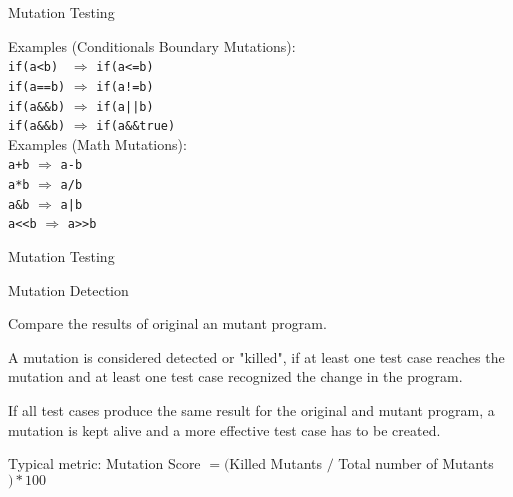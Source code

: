 \begin{frame}{Mutation Testing}
	
	
	Examples (Conditionals Boundary Mutations):\\
	\texttt{if(a<b)~} $\Rightarrow$ \texttt{if(a<=b)}\\
	\texttt{if(a==b)} $\Rightarrow$ \texttt{if(a!=b)}\\
	\texttt{if(a\&\&b)} $\Rightarrow$ \texttt{if(a||b)}\\
	\texttt{if(a\&\&b)} $\Rightarrow$ \texttt{if(a\&\&true)}\\	
	\xxx
	Examples (Math Mutations):\\
	\texttt{a+b} $\Rightarrow$ \texttt{a-b}\\
	\texttt{a*b} $\Rightarrow$ \texttt{a/b}\\
	\texttt{a\&b} $\Rightarrow$ \texttt{a|b}\\
	\texttt{a<<b} $\Rightarrow$ \texttt{a>>b}\\	
\end{frame}

\begin{frame}{Mutation Testing}
	\begin{block}{Mutation Detection}
		\begin{beameritemize}
			\item Compare the results of original an mutant program. 
			\item A mutation is considered detected or "killed", if at least one test case reaches the mutation and at least one test case recognized the change in the program.
			\item If all test cases produce the same result for the original and mutant program, a mutation is kept alive and a more effective test case has to be created.
			\item Typical metric: Mutation Score $=($Killed Mutants $/$ Total number of Mutants$)*100$
		\end{beameritemize}	
		
	\end{block}
	
\end{frame}


